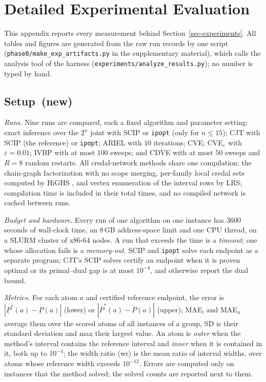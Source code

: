 \documentclass{article} %
\DeclareRobustCommand{\rev}[1]{{\color{blue}#1}}
\newcommand{\newtag}{\texorpdfstring{~\rev{(new)}}{}}
\newcommand{\lo}{\underline}
\newcommand{\hi}{\overline}
\begin{document}
\section{Detailed Experimental Evaluation}
\label{sec-full-results}

This appendix reports every measurement behind Section~\ref{sec-experiments}. All tables and figures are generated from the raw run records by one script (\texttt{phase0/make\_exp\_artifacts.py} in the supplementary material), which calls the analysis tool of the harness (\texttt{experiments/analyze\_results.py}); no number is typed by hand.

\subsection{Setup\newtag}
\label{sec-setup}

\emph{Runs.} Nine runs are compared, each a fixed algorithm and parameter setting: exact inference over the $2^n$ joint \citep{marinescu2022neurips} with SCIP or \texttt{ipopt} (only for $n\le 15$); CJT with SCIP (the reference) or \texttt{ipopt}; ARIEL with $10$ iterations; CVE; CVE$_\varepsilon$ with $\varepsilon=0.01$; IVBP with at most $100$ sweeps; and CDVE with at most $50$ sweeps and $R=8$ random restarts. All credal-network methods share one compilation: the chain-graph factorization with no scope merging, per-family local credal sets computed by HiGHS \citep{highs}, and vertex enumeration of the interval rows by LRS; compilation time is included in their total times, and no compiled network is cached between runs.

\emph{Budget and hardware.} Every run of one algorithm on one instance has $3600$ seconds of wall-clock time, an $8$\,GB address-space limit and one CPU thread, on a SLURM cluster of x86-64 nodes. A run that exceeds the time is a \emph{timeout}; one whose allocation fails is a \emph{memory-out}. SCIP and \texttt{ipopt} solve each endpoint as a separate program; CJT's SCIP solves certify an endpoint when it is proven optimal or its primal--dual gap is at most $10^{-4}$, and otherwise report the dual bound.

\emph{Metrics.} For each atom $a$ and certified reference endpoint, the error is $|\lo P^*(a)-\lo P(a)|$ (lower) or $|\hi P^*(a)-\hi P(a)|$ (upper); MAE$_l$ and MAE$_u$ average them over the scored atoms of all instances of a group, SD is their standard deviation and max their largest value. An atom is \emph{outer} when the method's interval contains the reference interval and \emph{inner} when it is contained in it, both up to $10^{-4}$; the width ratio (wr) is the mean ratio of interval widths, over atoms whose reference width exceeds $10^{-12}$. Errors are computed only on instances that the method solved; the solved counts are reported next to them.
\end{document}
